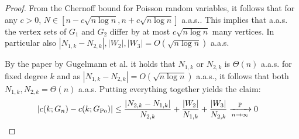 \begin{proof}
From the Chernoff bound for Poisson random variables, it follows that for any $c>0$, $N \in [n-c\sqrt{n\log n},n+c\sqrt{n\log n}]$ a.a.s.. This implies that a.a.s. the vertex sets of $G_1$ and $G_2$ differ by at most $c\sqrt{n\log n}$ many vertices. In particular also $|N_{1,k}-N_{2,k}|,|W_2|,|W_3|=O(\sqrt{n \log n})$ a.a.s. 

By the paper by Gugelmann et al. it holds that $N_{1,k}$ or $N_{2,k}$ is $\Theta(n)$ a.a.s. for fixed degree $k$ and as $|N_{1,k}-N_{2,k}| =O(\sqrt{n\log n})$ a.a.s., it follows that both $N_{1,k},N_{2,k} = \Theta(n)$ a.a.s. Putting everything together yields the claim:
\begin{align*}
|c(k;G_n)-c(k;G_{\text{Po}})| &\leq \frac{|N_{2,k}-N_{1,k}|}{N_{2,k}}+\frac{|W_2|}{N_{1,k}}+\frac{|W_3|}{N_{2,k}} \xrightarrow[n\rightarrow\infty]{\mathbb{P}} 0
\end{align*}


\end{proof}


